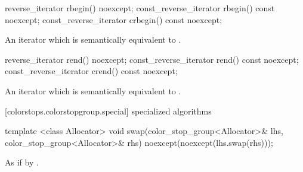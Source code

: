 \begin{itemdecl}
	reverse_iterator rbegin() noexcept;
	const_reverse_iterator rbegin() const noexcept;
	const_reverse_iterator crbegin() const noexcept;
\end{itemdecl}
\begin{itemdescr}
	\pnum
	\returns
	An iterator which is semantically equivalent to .
\end{itemdescr}

\begin{itemdecl}
	reverse_iterator rend() noexcept;
	const_reverse_iterator rend() const noexcept;
	const_reverse_iterator crend() const noexcept;
\end{itemdecl}
\begin{itemdescr}
	\pnum
	\returns
	An iterator which is semantically equivalent to .
\end{itemdescr}

[colorstops.colorstopgroup.special] { specialized algorithms}

\begin{itemdecl}
	template <class Allocator>
	void swap(color_stop_group<Allocator>& lhs, 
	  color_stop_group<Allocator>& rhs) noexcept(noexcept(lhs.swap(rhs)));
\end{itemdecl}
\begin{itemdescr}
	\pnum
	\effects
	As if by .
\end{itemdescr}
